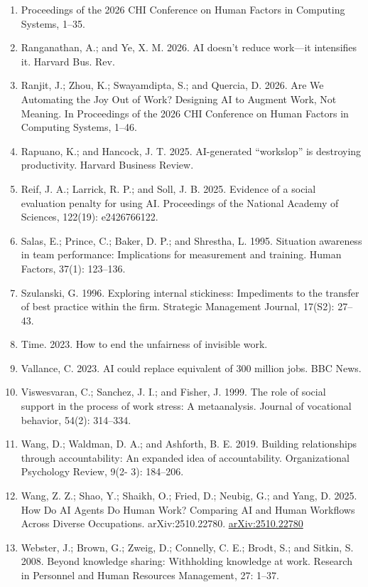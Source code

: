 \documentclass[11pt]{article}
\begin{document}
\begin{enumerate}[leftmargin=*]
  \item Proceedings of the 2026 CHI Conference on Human Factors in Computing Systems, 1–35.
  \item Ranganathan, A.; and Ye, X. M. 2026. AI doesn’t reduce work—it intensifies it. Harvard Bus. Rev.
  \item Ranjit, J.; Zhou, K.; Swayamdipta, S.; and Quercia, D. 2026. Are We Automating the Joy Out of Work? Designing AI to Augment Work, Not Meaning. In Proceedings of the 2026 CHI Conference on Human Factors in Computing Systems, 1–46.
  \item Rapuano, K.; and Hancock, J. T. 2025. AI-generated “workslop” is destroying productivity. Harvard Business Review.
  \item Reif, J. A.; Larrick, R. P.; and Soll, J. B. 2025. Evidence of a social evaluation penalty for using AI. Proceedings of the National Academy of Sciences, 122(19): e2426766122.
  \item Salas, E.; Prince, C.; Baker, D. P.; and Shrestha, L. 1995. Situation awareness in team performance: Implications for measurement and training. Human Factors, 37(1): 123–136.
  \item Szulanski, G. 1996. Exploring internal stickiness: Impediments to the transfer of best practice within the firm. Strategic Management Journal, 17(S2): 27–43.
  \item Time. 2023. How to end the unfairness of invisible work.
  \item Vallance, C. 2023. AI could replace equivalent of 300 million jobs. BBC News.
  \item Viswesvaran, C.; Sanchez, J. I.; and Fisher, J. 1999. The role of social support in the process of work stress: A metaanalysis. Journal of vocational behavior, 54(2): 314–334.
  \item Wang, D.; Waldman, D. A.; and Ashforth, B. E. 2019. Building relationships through accountability: An expanded idea of accountability. Organizational Psychology Review, 9(2- 3): 184–206.
  \item Wang, Z. Z.; Shao, Y.; Shaikh, O.; Fried, D.; Neubig, G.; and Yang, D. 2025. How Do AI Agents Do Human Work? Comparing AI and Human Workflows Across Diverse Occupations. arXiv:2510.22780. \href{https://arxiv.org/abs/2510.22780}{arXiv:2510.22780}
  \item Webster, J.; Brown, G.; Zweig, D.; Connelly, C. E.; Brodt, S.; and Sitkin, S. 2008. Beyond knowledge sharing: Withholding knowledge at work. Research in Personnel and Human Resources Management, 27: 1–37.

\end{enumerate}
\end{document}
